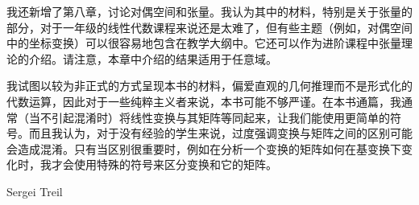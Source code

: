 \begin{preface}
我还新增了第八章，讨论对偶空间和张量。我认为其中的材料，特别是关于张量的部分，对于一年级的线性代数课程来说还是太难了，但有些主题（例如，对偶空间中的坐标变换）可以很容易地包含在教学大纲中。它还可以作为进阶课程中张量理论的介绍。请注意，本章中介绍的结果适用于任意域。

我试图以较为非正式的方式呈现本书的材料，偏爱直观的几何推理而不是形式化的代数运算，因此对于一些纯粹主义者来说，本书可能不够严谨。在本书通篇，我通常（当不引起混淆时）将线性变换与其矩阵等同起来，让我们能使用更简单的符号。而且我认为，对于没有经验的学生来说，过度强调变换与矩阵之间的区别可能会造成混淆。只有当区别很重要时，例如在分析一个变换的矩阵如何在基变换下变化时，我才会使用特殊的符号来区分变换和它的矩阵。
\vspace{5ex}
\begin{flushright}
Sergei Treil~~~~~~~~~
\end{flushright}

\end{preface}
